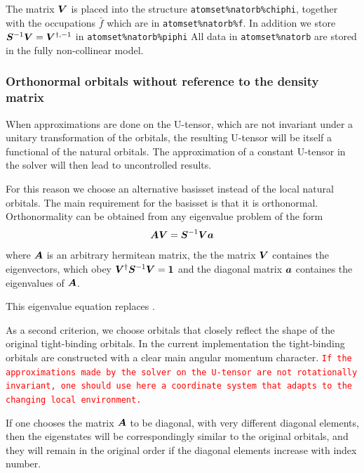 \documentclass[11pt,a4paper]{report}
\newcommand{\petertt}[1]{\textcolor{red}{\texttt{#1}}}
\begin{document}
The matrix $\bm{V}$ is placed into the structure
\verb|atomset%natorb%chiphi|, together with the occupations $\bar{f}$
which are in \verb|atomset%natorb%f|. In addition we store
$\bm{S}^{-1}\bm{V}=\bm{V}^{\dagger,-1}$ in
\verb|atomset%natorb%piphi| All data in \verb|atomset%natorb| are
stored in the fully non-collinear model.

\subsubsection{Orthonormal orbitals without reference to the density matrix}
When approximations are done on the U-tensor, which are not invariant
under a unitary transformation of the orbitals, the resulting U-tensor
will be itself a functional of the natural orbitals. The approximation
of a constant U-tensor in the solver will then lead to uncontrolled
results.

For this reason we choose an alternative basisset instead of the local
natural orbitals. The main requirement for the basisset is that it is
orthonormal.  Orthonormality can be obtained from any eigenvalue
problem of the form
\begin{eqnarray}
\bm{A}\bm{V}=\bm{S}^{-1}\bm{V}\bm{a}
\end{eqnarray}
where $\bm{A}$ is an arbitrary hermitean matrix, the the matrix
$\bm{V}$ containes the eigenvectors, which obey
$\bm{V}^\dagger\bm{S}^{-1}\bm{V}=\bm{1}$ and the diagonal matrix
$\bm{a}$ containes the eigenvalues of $\bm{A}$.

This eigenvalue equation replaces .

As a second criterion, we choose orbitals that closely reflect the
shape of the original tight-binding orbitals. In the current
implementation the tight-binding orbitals are constructed with a clear
main angular momentum character. \petertt{If the approximations made
  by the solver on the U-tensor are not rotationally invariant, one
  should use here a coordinate system that adapts to the changing
  local environment.}

If one chooses the matrix $\bm{A}$ to be diagonal, with very
different diagonal elements, then the eigenstates will be
correspondingly similar to the original orbitals, and they will remain
in the original order if the diagonal elements increase with index
number.
\end{document}
